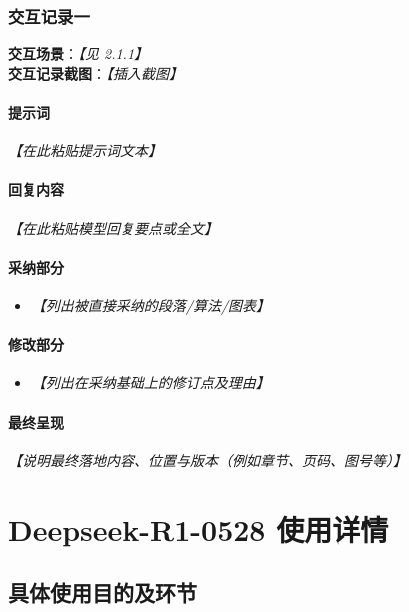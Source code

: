\documentclass[12pt]{ctexart}
\newcommand{\ph}[1]{\textit{【#1】}}
\begin{document}
\subsubsection{交互记录一}
\textbf{交互场景}：\ph{见 2.1.1} \\[4pt]
\textbf{交互记录截图}：\ph{插入截图}

\paragraph{提示词}
\begin{flushleft}
\ph{在此粘贴提示词文本}
\end{flushleft}

\paragraph{回复内容}
\begin{flushleft}
\ph{在此粘贴模型回复要点或全文}
\end{flushleft}

\paragraph{采纳部分}
\begin{itemize}[leftmargin=1.5em]
  \item \ph{列出被直接采纳的段落/算法/图表}
\end{itemize}

\paragraph{修改部分}
\begin{itemize}[leftmargin=1.5em]
  \item \ph{列出在采纳基础上的修订点及理由}
\end{itemize}

\paragraph{最终呈现}
\begin{flushleft}
\ph{说明最终落地内容、位置与版本（例如章节、页码、图号等）}
\end{flushleft}

\newpage

\section{Deepseek-R1-0528 使用详情}
\subsection{具体使用目的及环节}
\end{document}
